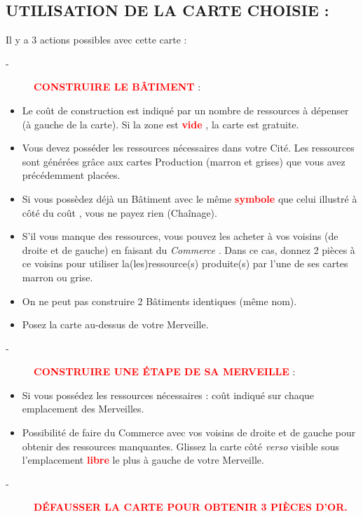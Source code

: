 \documentclass{scrartcl}%
\begin{document}
\subsection{ UTILISATION DE LA CARTE CHOISIE :
}%
\label{subsec:UTILISATIONDELACARTECHOISIE}%
Il y a 3 actions possibles avec cette carte :
%
\begin{description}%
\item[{-} ]%
%
\textcolor{red}{%
\textbf{CONSTRUIRE LE BÂTIMENT}%
}%
\textit{ }%
 :
%
\end{description}%
\begin{itemize}%
\item%
%
 Le coût de construction est indiqué par un nombre de ressources à dépenser (à gauche de la carte). Si la zone est %
\textcolor{red}{%
\textbf{vide}%
}%
, la carte est gratuite.
%
\item%
%
 Vous devez posséder les ressources nécessaires dans votre Cité. Les ressources sont générées grâce aux cartes Production (marron et grises) que vous avez précédemment placées.
%
\item%
%
 Si vous possèdez déjà un Bâtiment avec le même %
\textcolor{red}{%
\textbf{symbole}%
}%
\textit{ }%
 que celui illustré à côté du coût , vous ne payez rien (Chaînage).
%
\item%
%
 S'il vous manque des ressources, vous pouvez les acheter à vos voisins (de droite et de gauche) en faisant du %
\textit{Commerce}%
. Dans ce cas, donnez 2 pièces à ce voisins pour utiliser la(les)ressource(s) produite(s) par l'une de ses cartes marron ou grise.
%
\item%
%
 On ne peut pas construire 2 Bâtiments identiques (même nom).
%
\item%
%
 Posez la carte au{-}dessus de votre Merveille.
%
\end{itemize}%
\begin{description}%
\item[{-} ]%
%
\textcolor{red}{%
\textbf{CONSTRUIRE UNE ÉTAPE DE SA MERVEILLE}%
}%
\textit{ }%
 :
%
\end{description}%
\begin{itemize}%
\item%
%
 Si vous possédez les ressources nécessaires : coût indiqué sur chaque emplacement des Merveilles.
%
\item%
%
 Possibilité de faire du Commerce avec vos voisins de droite et de gauche pour obtenir des ressources manquantes. Glissez la carte côté %
\textit{verso}%
\textit{ }%
 visible sous l’emplacement %
\textcolor{red}{%
\textbf{libre}%
}%
\textit{ }%
 le plus à gauche de votre Merveille.
%
\end{itemize}%
\begin{description}%
\item[{-} ]%
%
\textcolor{red}{%
\textbf{DÉFAUSSER LA CARTE POUR OBTENIR 3 PIÈCES D’OR.}%
}%

%
\end{description}
\end{document}
